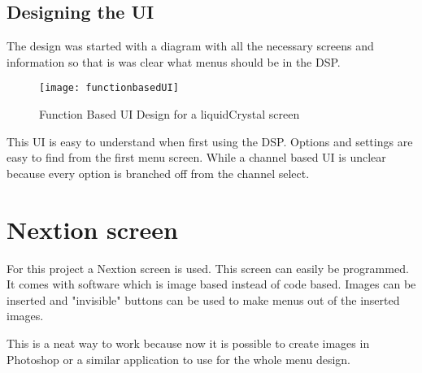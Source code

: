 \subsection{Designing the UI}
The design was started with a diagram with all the necessary screens and information so that is was clear what menus should be in the DSP. 

\begin{figure}[ht]
    \texttt{[image: functionbasedUI]}
    \caption{Function Based UI Design for a liquidCrystal screen}
    \label{fig:functionbasedUI}
\end{figure}

This UI is easy to understand when first using the DSP. Options and settings are easy to find from the first menu screen. While a channel based UI is unclear because every option is branched off from the channel select.

\section{Nextion screen}

For this project a Nextion screen is used. This screen can easily be programmed. It comes with software which is image based instead of code based. Images can be inserted and "invisible" buttons can be used to make menus out of the inserted images.

This is a neat way to work because now it is possible to create images in Photoshop or a similar application to use for the whole menu design.